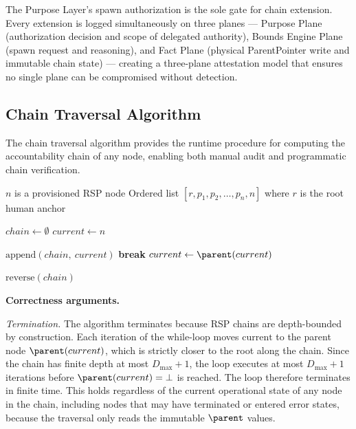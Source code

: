 The Purpose Layer's spawn authorization is the sole gate for chain extension. Every extension is logged simultaneously on three planes --- Purpose Plane (authorization decision and scope of delegated authority), Bounds Engine Plane (spawn request and reasoning), and Fact Plane (physical ParentPointer write and immutable chain state) --- creating a three-plane attestation model that ensures no single plane can be compromised without detection.

\subsection{Chain Traversal Algorithm}

The chain traversal algorithm provides the runtime procedure for computing the accountability chain of any node, enabling both manual audit and programmatic chain verification.

\begin{algorithm}
\caption{Chain-Traverse($n$) --- Compute the accountability chain from node $n$ to the human anchor}
\label{alg:chain-traverse}
\begin{algorithmic}[1]
\REQUIRE $n$ is a provisioned RSP node
\ENSURE Ordered list $[r, p_1, p_2, \dots, p_n, n]$ where $r$ is the root human anchor

\STATE $chain \leftarrow \emptyset$ 
\STATE $current \leftarrow n$ 

    \STATE $\text{append}(chain,\ current)$ 
        \STATE \textbf{break} 
    \ENDIF
    \STATE $current \leftarrow \parent(current)$ 
\ENDWHILE

\RETURN $\text{reverse}(chain)$ 
\end{algorithmic}
\end{algorithm}

\bigskip
\noindent\textbf{Correctness arguments.}

\textit{Termination.} The algorithm terminates because RSP chains are depth-bounded by construction. Each iteration of the while-loop moves $\text{current}$ to the parent node $\parent(current)$, which is strictly closer to the root along the chain. Since the chain has finite depth at most $D_{\max} + 1$, the loop executes at most $D_{\max} + 1$ iterations before $\parent(current) = \bot$ is reached. The loop therefore terminates in finite time. This holds regardless of the current operational state of any node in the chain, including nodes that may have terminated or entered error states, because the traversal only reads the immutable $\parent$ values.

